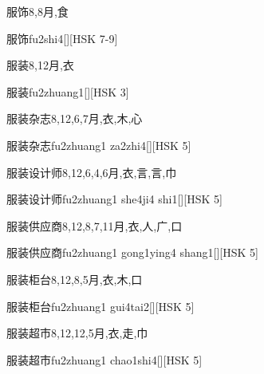 \begin{Entry}{服饰}{8,8}{⽉,⾷}
  \begin{Phonetics}{服饰}{fu2shi4}[][HSK 7-9]
  \end{Phonetics}
\end{Entry}

\begin{Entry}{服装}{8,12}{⽉,⾐}
  \begin{Phonetics}{服装}{fu2zhuang1}[][HSK 3]
  \end{Phonetics}
\end{Entry}

\begin{Entry}{服装杂志}{8,12,6,7}{⽉,⾐,⽊,⼼}
  \begin{Phonetics}{服装杂志}{fu2zhuang1 za2zhi4}[][HSK 5]
  \end{Phonetics}
\end{Entry}

\begin{Entry}{服装设计师}{8,12,6,4,6}{⽉,⾐,⾔,⾔,⼱}
  \begin{Phonetics}{服装设计师}{fu2zhuang1 she4ji4 shi1}[][HSK 5]
  \end{Phonetics}
\end{Entry}

\begin{Entry}{服装供应商}{8,12,8,7,11}{⽉,⾐,⼈,⼴,⼝}
  \begin{Phonetics}{服装供应商}{fu2zhuang1 gong1ying4 shang1}[][HSK 5]
  \end{Phonetics}
\end{Entry}

\begin{Entry}{服装柜台}{8,12,8,5}{⽉,⾐,⽊,⼝}
  \begin{Phonetics}{服装柜台}{fu2zhuang1 gui4tai2}[][HSK 5]
  \end{Phonetics}
\end{Entry}

\begin{Entry}{服装超市}{8,12,12,5}{⽉,⾐,⾛,⼱}
  \begin{Phonetics}{服装超市}{fu2zhuang1 chao1shi4}[][HSK 5]
  \end{Phonetics}
\end{Entry}

